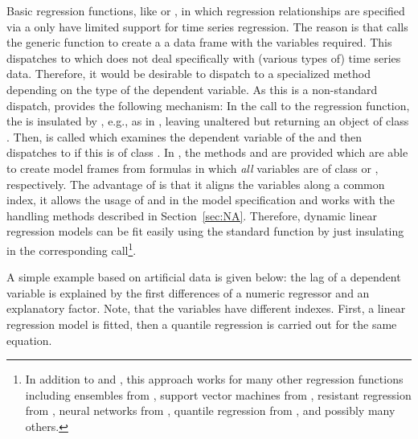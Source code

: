 \documentclass{Z}
\begin{document}
Basic regression functions, like  or , in which regression
relationships are specified via a  only have limited
support for time series regression. The reason is that 
calls the generic function  to create a 
a data frame with the variables required. This dispatches to 
which does not deal specifically with (various types of) time series data.
Therefore, it would be desirable to dispatch to a specialized 
method depending on the type of the dependent variable. As this is a non-standard
dispatch,  provides the following mechanism: In the call to the regression 
function, the  is insulated by , e.g., as in
, leaving  unaltered but returning an object
of class . Then,  is called which examines the
dependent variable of the  and then dispatches to 
if this is of class . In , the methods 
and  are provided which are able to create model frames
from formulas in which \emph{all} variables are of class  or ,
respectively. The advantage of  is that it aligns
the variables along a common index, it allows the usage of  and
 in the model specification and works with the  handling methods
described in Section~\ref{sec:NA}. Therefore, dynamic linear regression models
can be fit easily using the standard  function by just insulating
 in the corresponding call\footnote{In addition to 
and , this approach works for many other regression functions including
 ensembles from ,
 support vector machines from ,
 resistant regression from ,
 neural networks from ,
 quantile regression from ,
and possibly many others.}.

A simple example based on artificial data is given below: the lag of a dependent
variable is explained by the first differences of a numeric regressor and an
explanatory factor. Note, that the variables have different indexes. First, a linear
regression model is fitted, then a quantile regression is carried out for the same
equation.
\end{document}
